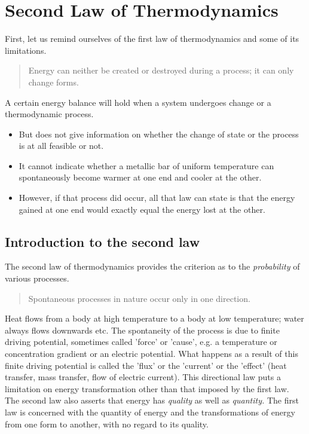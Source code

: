 \documentclass[class=report, crop=false, 12pt,a4paper]{standalone}
\begin{document}
\section{Second Law of Thermodynamics}
First, let us remind ourselves of the first law of thermodynamics and some of its limitations. 
\begin{quote}
  \begin{center}
    Energy can neither be created or destroyed during a process; it can only change forms.
  \end{center}
\end{quote}
A certain energy balance will hold when a system undergoes change or a thermodynamic process.
\begin{itemize}[noitemsep]
  \item But does not give information on whether the change of state or the process is at all feasible or not.
  \item It cannot indicate whether a metallic bar of uniform temperature can spontaneously become warmer at one end and cooler at the other.
  \item However, if that process did occur, all that law can state is that the energy gained at one end would exactly equal the energy lost at the other.
\end{itemize}
\subsection{Introduction to the second law}
The second law of thermodynamics provides the criterion as to the \emph{probability} of various processes. 
\begin{quote}
  \begin{center}
    Spontaneous processes in nature occur only in one direction. 
  \end{center}
\end{quote}
Heat flows from a body at high temperature to a body at low temperature; water always flows downwards etc. The spontaneity of the process is due to finite driving potential, sometimes called 'force' or 'cause', e.g. a temperature or concentration gradient or an electric potential. What happens as a result of this finite driving potential is called the 'flux' or the 'current' or the 'effect' (heat transfer, mass transfer, flow of electric current). This directional law puts a limitation on energy transformation other than that imposed by the first law. The second law also asserts that energy has \emph{quality} as well as \emph{quantity.} The first law is concerned with the quantity of energy and the transformations of energy from one form to another, with no regard to its quality. 
\end{document}
